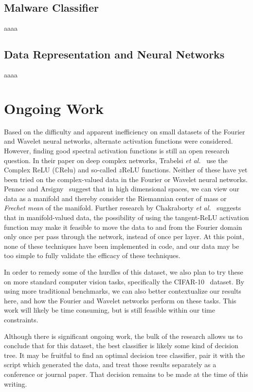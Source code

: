\documentclass[10pt]{article}
\begin{document}
\subsection{Malware Classifier} \label{malware classifier}
aaaa

\subsection{Data Representation and Neural Networks} \label{data representation}
aaaa

\section{Ongoing Work}
Based on the difficulty and apparent inefficiency on small datasets of the Fourier and Wavelet neural networks, alternate activation functions were considered. 
However, finding good spectral activation functions is still an open research question.
In their paper on deep complex networks, Trabelsi \textit{et al.}~\cite{trabelsi2017deep} use the Complex ReLU ($\mathbb{C}$Relu) and so-called $z$ReLU functions. 
Neither of these have yet been tried on the complex-valued data in the Fourier or Wavelet neural networks.
Pennec and Arsigny~\cite{pennec2013information} suggest that in high dimensional spaces, we can view our data as a manifold and thereby consider the Riemannian center of mass or \textit{Frechet mean} of the manifold.
Further research by Chakraborty \textit{et al.}~\cite{chakraborty2019surreal} suggests that in manifold-valued data, the possibility of using the tangent-ReLU activation function may make it feasible to move the data to and from the Fourier domain only once per pass through the network, instead of once per layer.
At this point, none of these techniques have been implemented in code, and our data may be too simple to fully validate the efficacy of these techniques.

In order to remedy some of the hurdles of this dataset, we also plan to try these on more standard computer vision tasks, specifically the CIFAR-10~\cite{krizhevsky2009learning} dataset. 
By using more traditional benchmarks, we can also better contextualize our results here, and how the Fourier and Wavelet networks perform on these tasks.
This work will likely be time consuming, but is still feasible within our time constraints.

Although there is significant ongoing work, the bulk of the research allows us to conclude that for this dataset, the best classifier is likely some kind of decision tree.
It may be fruitful to find an optimal decision tree classifier, pair it with the script which generated the data, and treat those results separately as a conference or journal paper. 
That decision remains to be made at the time of this writing.
\end{document}
